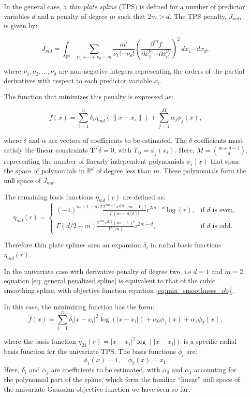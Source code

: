 \documentclass[
11pt, %
oneside, %
english, %
singlespacing, %
]{macthesis} %
\begin{document}
In the general case, a \emph{thin plate spline} (TPS) is defined for a number of predictor variables \(d\) and a penalty of degree \(m\) such that \(2m > d\). The TPS penalty, \(J_{md}\), is given by:

\[
J_{md} = \int_{\mathbb{R}^d} \sum_{\nu_1 + \cdots + \nu_d = m} \frac{m!}{\nu_1! \cdots \nu_d!} \left( \frac{\partial^m f}{\partial x_1^{\nu_1} \cdots \partial x_d^{\nu_d}} \right)^2 \, dx_1 \cdots dx_d,
\]

where \(\nu_1, \nu_2, \ldots, \nu_d\) are non-negative integers representing the orders of the partial derivatives with respect to each predictor variable \(x_i\).

The function that minimizes this penalty is expressed as:

\[
\hat{f}(x) = \sum_{i=1}^n \delta_i \eta_{md}(\|x - x_i\|) + \sum_{j=1}^M \alpha_j \phi_j(x),
\]

where \(\delta\) and \(\alpha\) are vectors of coefficients to be estimated. The \(\delta\) coefficients must satisfy the linear constraints \(\mathbf{T}^T \delta = 0\), with \(T_{ij} = \phi_j(x_i)\). Here, \(M = \binom{m+d-1}{d}\), representing the number of linearly independent polynomials \(\phi_i(x)\) that span the space of polynomials in \(\mathbb{R}^d\) of degree less than \(m\). These polynomials form the null space of \(J_{md}\).

The remaining basis functions \(\eta_{md}(r)\) are defined as:
\[
\eta_{md}(r) = 
\begin{cases} 
(-1)^{m+1+d/2} \frac{2^{2m-1} \pi^{d/2} (m-1)!}{\Gamma(m-d/2)!} r^{2m-d} \log(r), & \text{if } d \text{ is even}, \\
\Gamma(d/2 - m) \frac{2^{2m} \pi^{d/2} (m-1)!}{\Gamma(m)} r^{2m-d}, & \text{if } d \text{ is odd}.
\end{cases}
\]

Therefore thin plate splines area an expansion \(\delta_i\) in radial basis functions \(\eta_{md} (r)\).

In the univariate case with derivative penalty of degree two, i.e \(d =  1\) and \(m = 2\), equation \ref{eq: general penalized spline} is equivalent to that of the cubic smoothing spline, with objective function equation \ref{eq:min_smoothness_obj}.

In this case, the minimizing function has the form:
\[
\hat{f}(x) = \sum_{i=1}^n \delta_i |x - x_i|^2 \log(|x - x_i|) + \alpha_0\phi_1(x) + \alpha_1 \phi_2(x),
\]

where the basis function \(\eta_{21}(r) =|x - x_i|^2 \log(|x - x_i|)\) is a specific radial basis function for the univariate TPS. The basis functions \(\phi_i\) are:
\[
\phi_1(x) = 1, \quad \phi_2(x) = x_1.
\]
Here, \(\delta_i\) and \(\alpha_j\) are coefficients to be estimated, with \(\alpha_0\) and \(\alpha_1\) accounting for the polynomial part of the spline, which form the familiar ``linear'' null space of the univariate Gaussian objective function we have seen so far.
\end{document}
